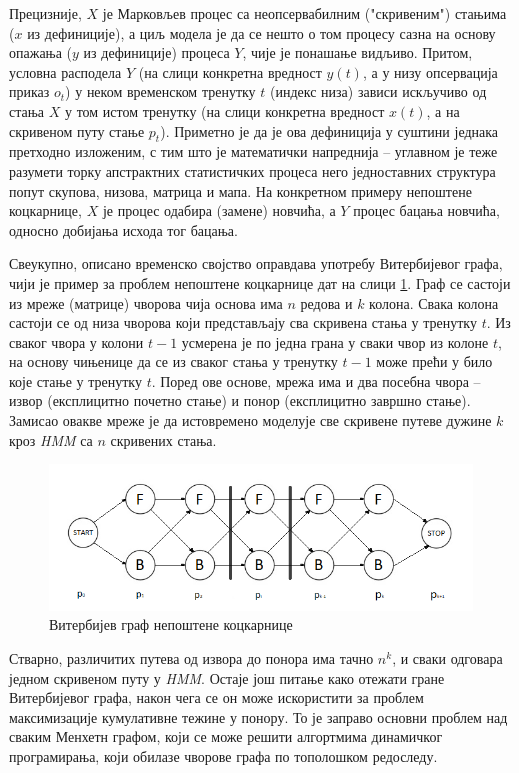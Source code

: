 \documentclass[12pt,oneside]{memoir}
\begin{document}
\begin{CJK}{UTF8}{ipxm}
Прецизније, $X$ је Марковљев процес са неопсервабилним ("скривеним") стањима ($x$ из дефиниције), а циљ модела је да се нешто о том процесу сазна на основу опажања ($y$ из дефиниције) процеса $Y$, чије је понашање видљиво. Притом, условна расподела $Y$ (на слици конкретна вредност $y(t)$, а у низу опсервација приказ $o_t$) у неком временском тренутку $t$ (индекс низа) зависи искључиво од стања $X$ у том истом тренутку (на слици конкретна вредност $x(t)$, а на скривеном путу стање $p_t$). Приметно је да је ова дефиниција у суштини једнака претходно изложеним, с тим што је математички напреднија -- углавном је теже разумети торку апстрактних статистичких процеса него једноставних структура попут скупова, низова, матрица и мапа. На конкретном примеру непоштене коцкарнице, $X$ је процес одабира (замене) новчића, а $Y$ процес бацања новчића, односно добијања исхода тог бацања.

Свеукупно, описано временско својство оправдава употребу Витербијевог графа, чији је пример за проблем непоштене коцкарнице дат на слици \ref{fig:kockvit}. Граф се састоји из мреже (матрице) чворова чија основа има $n$ редова и $k$ колона. Свака колона састоји се од низа чворова који представљају сва скривена стања у тренутку $t$. Из сваког чвора у колони $t-1$ усмерена је по једна грана у сваки чвор из колоне $t$, на основу чињенице да се из сваког стања у тренутку $t-1$ може прећи у било које стање у тренутку $t$. Поред ове основе, мрежа има и два посебна чвора -- извор (експлицитно почетно стање) и понор (експлицитно завршно стање). Замисао овакве мреже је да истовремено моделује све скривене путеве дужине $k$ кроз \textit{HMM} са $n$ скривених стања.

\begin{figure}[H]
  \centering
  \includegraphics[width=\textwidth]{kock_graf.png}
  \caption{Витербијев граф непоштене коцкарнице}
  \label{fig:kockvit}
\end{figure}

Стварно, различитих путева од извора до понора има тачно $n^k$, и сваки одговара једном скривеном путу у \textit{HMM}. Остаје још питање како отежати гране Витербијевог графа, након чега се он може искористити за проблем максимизације кумулативне тежине у понору. То је заправо основни проблем над сваким Менхетн графом, који се може решити алгортмима динамичког програмирања, који обилазе чворове графа по тополошком редоследу.


\end{CJK}
\end{document}
